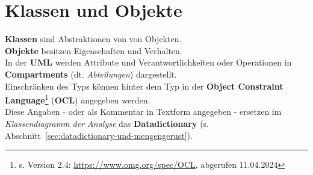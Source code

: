 \section{Klassen und Objekte}

\noindent
\textbf{Klassen} sind Abstraktionen von von Objekten.\\

\noindent
\textbf{Objekte} besitzen Eigenschaften und Verhalten.\\

\noindent
In der \textbf{UML} werden Attribute und Verantwortlichkeiten oder Operationen in \textbf{Compartments} (dt. \textit{Abteilungen}) dargestellt.\\

\noindent
Einschränken des Typs können hinter dem Typ in der \textbf{Object Constraint Language}\footnote{
s. Version 2.4: \url{https://www.omg.org/spec/OCL}, abgerufen 11.04.2024
} (\textbf{OCL}) angegeben werden.\\
Diese Angaben - oder als Kommentar in Textform angegeben - ersetzen im \textit{Klassendiagramm der Analyse} das \textbf{Datadictionary} (s. Abschnitt~\ref{sec:datadictionary-und-mengengerust}).